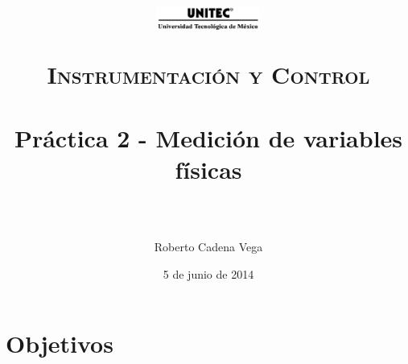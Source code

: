 



\title{	
	\normalfont \normalsize
	\begin{figure}[h]
		\begin{center}
			\includegraphics[width=0.3\textwidth]{../images/UNITEC.png} %
		\end{center}
	\end{figure}
	\textsc{Instrumentación y Control} \\ [25pt]
	\horrule{0.5pt} \\[0.4cm] %
	\huge Práctica 2 - Medición de variables físicas \\ %
	\horrule{2pt} \\[0.5cm] %
}

\author{Roberto Cadena Vega} %

\date{\normalsize 5 de junio de 2014} %




\maketitle %


\section{Objetivos}

